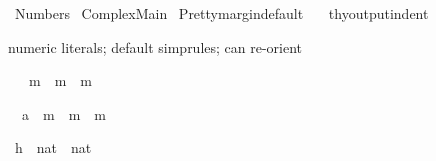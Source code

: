 %
\begin{isabellebody}%
\def\isabellecontext{Numbers}%
%
\isadelimtheory
%
\endisadelimtheory
%
\isatagtheory
{}\isamarkupfalse%
\ Numbers\isanewline
{}\ Complex{}Main\isanewline
{}%
\endisatagtheory
{\isafoldtheory}%
%
\isadelimtheory
\isanewline
%
\endisadelimtheory
%
\isadelimML
\isanewline
%
\endisadelimML
%
\isatagML
{}\isamarkupfalse%
\ {}Pretty{}margin{}default\ {}{}\ {}{}{}%
\endisatagML
{\isafoldML}%
%
\isadelimML
\isanewline
%
\endisadelimML
{}\isamarkupfalse%
\ {}{}thy{}output{}indent\ {}\ {}{}{}%
\begin{isamarkuptext}%
numeric literals; default simprules; can re-orient%
\end{isamarkuptext}%
\isamarkuptrue%
\isamarkupfalse%
\ {}{}\ {}\ m\ {}\ m\ {}\ m{}%
\isadelimproof
%
\endisadelimproof
%
\isatagproof
%
\begin{isamarkuptxt}%
\begin{isabelle}%
\ {}{}\ {}{}{}{}a{}\ {}\ m\ {}\ m\ {}\ m%
\end{isabelle}%
\end{isamarkuptxt}%
\isamarkuptrue%
\isamarkupfalse%
%
\endisatagproof
{\isafoldproof}%
%
\isadelimproof
%
\endisadelimproof
\isanewline
\isanewline
{}\isamarkupfalse%
\ h\ {}{}\ {}nat\ {}\ nat{}\ \isanewline

\end{isabellebody}
